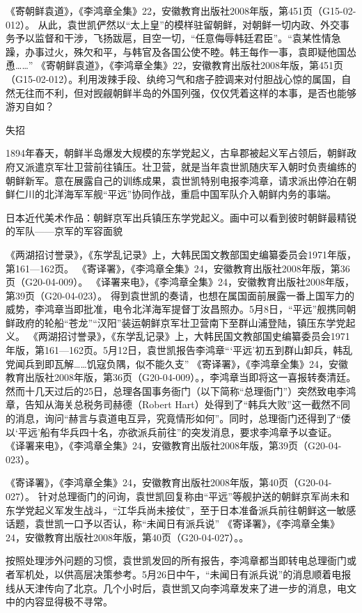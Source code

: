 \documentclass[12pt,UTF8]{ctexbook}
\begin{document}
《寄朝鲜袁道》，《李鸿章全集》22，安徽教育出版社2008年版，第451页（G15-02-012）。
从此，袁世凯俨然以“太上皇”的模样驻留朝鲜，对朝鲜一切内政、外交事务予以监督和干涉，飞扬跋扈，目空一切，“任意侮辱韩廷君臣”。“袁某性情急躁，办事过火，殊欠和平，与韩官及各国公使不睦。韩王每作一事，袁即疑他国怂恿……” 《寄朝鲜袁道》，《李鸿章全集》22，安徽教育出版社2008年版，第451页（G15-02-012）。利用泼辣手段、纨绔习气和痞子腔调来对付胆战心惊的属国，自然无往而不利，但对觊觎朝鲜半岛的外国列强，仅仅凭着这样的本事，是否也能够游刃自如？

失招

1894年春天，朝鲜半岛爆发大规模的东学党起义，古阜郡被起义军占领后，朝鲜政府又派遣京军壮卫营前往镇压。壮卫营，就是当年袁世凯随庆军入朝时负责编练的朝鲜新军。意在展露自己的训练成果，袁世凯特别电报李鸿章，请求派出停泊在朝鲜仁川的北洋海军军舰“平远”协同作战，重启中国军队介入朝鲜内务的事端。


日本近代美术作品：朝鲜京军出兵镇压东学党起义。画中可以看到彼时朝鲜最精锐的军队——京军的军容面貌

《两湖招讨誉录》，《东学乱记录》上，大韩民国文教部国史编纂委员会1971年版，第161—162页。
《寄译署》，《李鸿章全集》24，安徽教育出版社2008年版，第36页（G20-04-009）。
《译署来电》，《李鸿章全集》24，安徽教育出版社2008年版，第39页（G20-04-023）。
得到袁世凯的奏请，也想在属国面前展露一番上国军力的威势，李鸿章当即批准，电令北洋海军提督丁汝昌照办。5月8日，“平远”舰携同朝鲜政府的轮船“苍龙”“汉阳”装运朝鲜京军壮卫营南下至群山浦登陆，镇压东学党起义。 《两湖招讨誉录》，《东学乱记录》上，大韩民国文教部国史编纂委员会1971年版，第161—162页。5月12日，袁世凯报告李鸿章“‘平远’初五到群山卸兵，韩乱党闻兵到即瓦解……饥寇负隅，似不能久支” 《寄译署》，《李鸿章全集》24，安徽教育出版社2008年版，第36页（G20-04-009）。，李鸿章当即将这一喜报转奏清廷。然而十几天过后的25日，总理各国事务衙门（以下简称“总理衙门”）突然致电李鸿章，告知从海关总税务司赫德（Robert Hart）处得到了“韩兵大败”这一截然不同的消息，询问“赫言与袁道电互异，究竟情形如何”。同时，总理衙门还得到了“倭以‘平远’船有华兵四十名，亦欲派兵前往”的突发消息，要求李鸿章予以查证。 《译署来电》，《李鸿章全集》24，安徽教育出版社2008年版，第39页（G20-04-023）。

《寄译署》，《李鸿章全集》24，安徽教育出版社2008年版，第40页（G20-04-027）。
针对总理衙门的问询，袁世凯回复称由“平远”等舰护送的朝鲜京军尚未和东学党起义军发生战斗，“江华兵尚未接仗”，至于日本准备派兵前往朝鲜这一敏感话题，袁世凯一口予以否认，称“未闻日有派兵说” 《寄译署》，《李鸿章全集》24，安徽教育出版社2008年版，第40页（G20-04-027）。。

按照处理涉外问题的习惯，袁世凯发回的所有报告，李鸿章都当即转电总理衙门或者军机处，以供高层决策参考。5月26日中午，“未闻日有派兵说”的消息顺着电报线从天津传向了北京。几个小时后，袁世凯又向李鸿章发来了进一步的消息，电文中的内容显得极不寻常。
\end{document}

